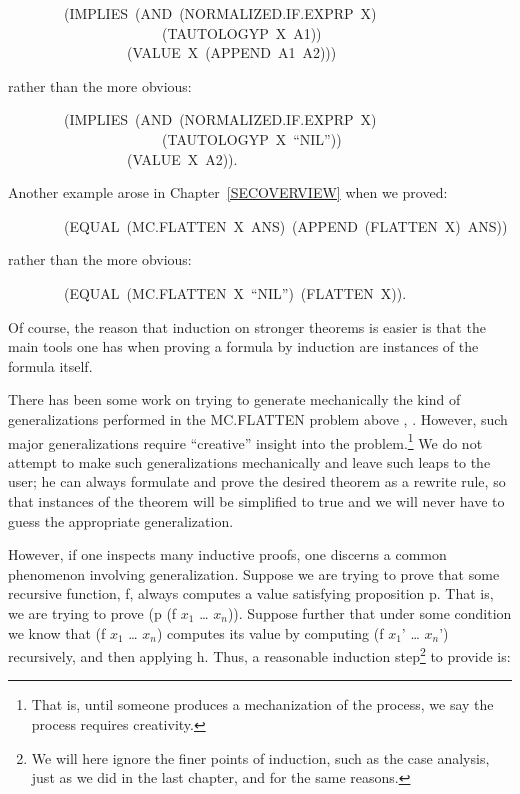 \documentclass[10pt]{book}
\newenvironment{pubasis}{\begin{flushleft}}{\end{flushleft}}
\begin{document}
\begin{pubasis}
~~~~~~~~(IMPLIES~(AND~(NORMALIZED.IF.EXPRP~X)\\
~~~~~~~~~~~~~~~~~~~~~~(TAUTOLOGYP~X~A1))\\
~~~~~~~~~~~~~~~~~(VALUE~X~(APPEND~A1~A2)))\\
\end{pubasis}
rather than the more obvious:
\begin{pubasis}
~~~~~~~~(IMPLIES~(AND~(NORMALIZED.IF.EXPRP~X)\\
~~~~~~~~~~~~~~~~~~~~~~(TAUTOLOGYP~X~``NIL''))\\
~~~~~~~~~~~~~~~~~(VALUE~X~A2)).\\
\end{pubasis}
Another example arose in Chapter~\ref{SECOVERVIEW}
when we proved:

\begin{pubasis}
~~~~~~~~(EQUAL~(MC.FLATTEN~X~ANS)~(APPEND~(FLATTEN~X)~ANS))\\
\end{pubasis}
rather than the more obvious:
\begin{pubasis}
~~~~~~~~(EQUAL~(MC.FLATTEN~X~``NIL'')~(FLATTEN~X)).\\
\end{pubasis}
Of course, the reason that  induction on stronger theorems is easier is
that the main tools one has when proving a formula by induction
are instances of the formula itself.

There has been some work on trying to generate mechanically 
the kind of generalizations performed in the MC.FLATTEN
problem above \cite{IEEE}, \cite{AUBIN}.  However,
such major generalizations require ``creative'' insight into the
problem.\footnote{That is, until someone produces a mechanization of the process, we say the process requires creativity.}
We do not attempt to make such generalizations mechanically and
leave such leaps to the user; he can always formulate and prove the desired theorem as a rewrite
rule, so that instances of
the theorem will be simplified to true and we will never have to guess the appropriate generalization.

However, if one inspects many inductive proofs, one discerns a common phenomenon
involving generalization.
Suppose we are trying to prove that some recursive function, f,
always computes a value satisfying proposition p.  That is, we are trying to
prove (p (f $x_{1}$ \ldots{} $x_{n}$)).   Suppose further that under some condition we know that
(f $x_{1}$ \ldots{} $x_{n}$) computes its value by computing (f $x_{1}$' \ldots{} $x_{n}$') recursively, and then
applying h.  Thus, a reasonable induction step\footnote{We will here ignore the finer points of induction, such as the case analysis, just as we did in the last chapter, and for the same reasons.}
 to provide is:
\end{document}
